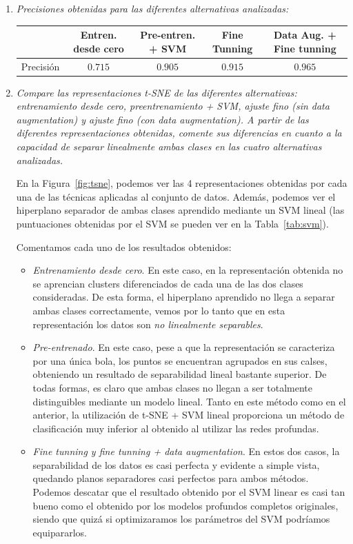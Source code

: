 \documentclass[11pt]{article}
\begin{document}
\begin{enumerate}
    \item \emph{Precisiones obtenidas para las diferentes alternativas analizadas:}
        \begin{table}[H]
            \centering
            \begin{tabular}{c|cccc}
                            & \textbf{Entren. desde cero} & \textbf{Pre-entren. + SVM} & \textbf{Fine Tunning} & \textbf{Data Aug. + Fine tunning} \\ \hline
                 Precisión & \( 0.715 \)  & \( 0.905 \)  & \( 0.915 \)  &  \( 0.965 \)         \\
            \end{tabular}
        \end{table}
    \item \emph{Compare las representaciones t-SNE de las diferentes alternativas: entrenamiento desde cero, preentrenamiento + SVM, ajuste fino (sin data augmentation) y ajuste fino (con data augmentation). A partir de las diferentes representaciones obtenidas, comente sus diferencias en cuanto a la capacidad de separar linealmente ambas clases en las cuatro alternativas analizadas.}
    
    En la Figura~\ref{fig:tsne}, podemos ver las 4 representaciones obtenidas por cada una de las técnicas aplicadas al conjunto de datos. Además, podemos ver el hiperplano separador de ambas clases aprendido mediante un SVM lineal (las puntuaciones obtenidas por el SVM se pueden ver en la Tabla~\ref{tab:svm}).

    Comentamos cada uno de los resultados obtenidos:
    \begin{itemize}
        \item \emph{Entrenamiento desde cero}. En este caso, en la representación obtenida no se aprencian clusters diferenciados de cada una de las dos clases consideradas. De esta forma, el hiperplano aprendido no llega a separar ambas clases correctamente, vemos por lo tanto que en esta representación los datos son \emph{no linealmente separables}.
        \item \emph{Pre-entrenado}. En este caso, pese a que la representación se caracteriza por una única bola, los puntos se encuentran agrupados en sus calses, obteniendo un resultado de separabilidad lineal bastante superior. De todas formas, es claro que ambas clases no llegan a ser totalmente distinguibles mediante un modelo lineal. Tanto en este método como en el anterior, la utilización de t-SNE + SVM lineal proporciona un método de clasificación muy inferior al obtenido al utilizar las redes profundas.
        \item \emph{Fine tunning y fine tunning + data augmentation}. En estos dos casos, la separabilidad de los datos es casi perfecta y evidente a simple vista, quedando planos separadores casi perfectos para ambos métodos. Podemos descatar que el resultado obtenido por el SVM linear es casi tan bueno como el obtenido por los modelos profundos completos originales, siendo que quizá si optimizaramos los parámetros del SVM podríamos equipararlos. 
    \end{itemize}


\end{enumerate}
\end{document}
